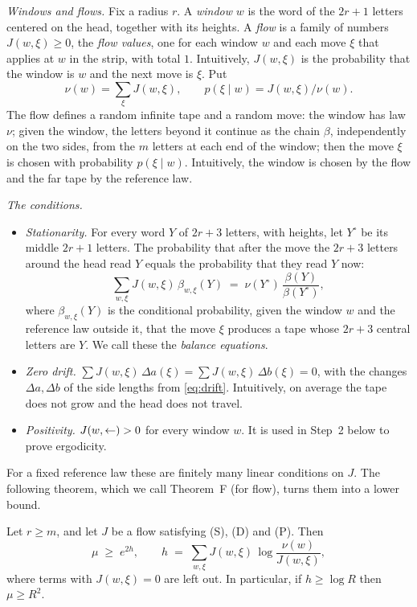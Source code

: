 \emph{Windows and flows.} Fix a radius $r$. A \emph{window} $w$ is the word of the $2r+1$ letters centered on the head,
together with its heights. A \emph{flow} is a family of numbers $J(w,\xi)\ge0$, the \emph{flow values}, one for each
window $w$ and each move $\xi$ that applies at $w$ in the strip, with total $1$. Intuitively, $J(w,\xi)$ is the
probability that the window is $w$ and the next move is $\xi$. Put
\[ \nu(w)=\sum_\xi J(w,\xi),\qquad p(\xi\mid w)=J(w,\xi)/\nu(w). \]
The flow defines a random infinite tape and a random move: the window has law $\nu$; given the window, the letters
beyond it continue as the chain $\beta$, independently on the two sides, from the $m$ letters at each end of the
window; then the move $\xi$ is chosen with probability $p(\xi\mid w)$. Intuitively, the window is chosen by the flow
and the far tape by the reference law.

\emph{The conditions.}
\begin{itemize}
\item[(S)] \emph{Stationarity.} For every word $Y$ of $2r+3$ letters, with heights, let $Y^\circ$ be its middle
$2r+1$ letters. The probability that after the move the $2r+3$ letters around the head read $Y$ equals the probability
that they read $Y$ now:
\[ \sum_{w,\xi}J(w,\xi)\,\beta_{w,\xi}(Y) \;=\; \nu(Y^\circ)\,\frac{\beta(Y)}{\beta(Y^\circ)}, \]
where $\beta_{w,\xi}(Y)$ is the conditional probability, given the window $w$ and the reference law outside it, that
the move $\xi$ produces a tape whose $2r+3$ central letters are $Y$. We call these the \emph{balance equations}.
\item[(D)] \emph{Zero drift.} $\sum J(w,\xi)\,\Delta a(\xi)=\sum J(w,\xi)\,\Delta b(\xi)=0$, with the changes
$\Delta a,\Delta b$ of the side lengths from \eqref{eq:drift}. Intuitively, on average the tape does not grow and the
head does not travel.
\item[(P)] \emph{Positivity.} $J(w,\mathord{\leftarrow})>0$ for every window $w$. It is used in Step~2 below to prove
ergodicity.
\end{itemize}
For a fixed reference law these are finitely many linear conditions on $J$. The following theorem, which we call
Theorem~F (for flow), turns them into a lower bound.

\begin{theoremF}
Let $r\ge m$, and let $J$ be a flow satisfying (S), (D) and (P). Then
\[ \mu\;\ge\;e^{2h},\qquad h\;=\;\sum_{w,\xi}J(w,\xi)\,\log\frac{\nu(w)}{J(w,\xi)} , \]
where terms with $J(w,\xi)=0$ are left out. In particular, if $h\ge\log R$ then $\mu\ge R^2$.
\end{theoremF}

